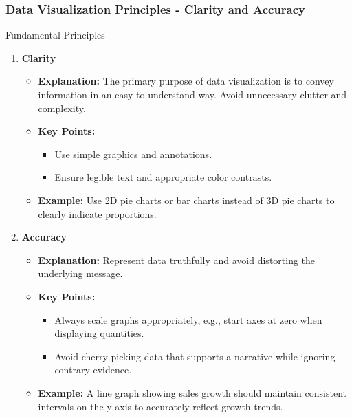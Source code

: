 \documentclass[aspectratio=169]{beamer}
\begin{document}
\begin{frame}[fragile]
    \frametitle{Data Visualization Principles - Clarity and Accuracy}
    \begin{block}{Fundamental Principles}
        \begin{enumerate}
            \item \textbf{Clarity}
                \begin{itemize}
                    \item \textbf{Explanation:} The primary purpose of data visualization is to convey information in an easy-to-understand way. Avoid unnecessary clutter and complexity.
                    \item \textbf{Key Points:}
                        \begin{itemize}
                            \item Use simple graphics and annotations.
                            \item Ensure legible text and appropriate color contrasts.
                        \end{itemize}
                    \item \textbf{Example:} Use 2D pie charts or bar charts instead of 3D pie charts to clearly indicate proportions.
                \end{itemize}
            \item \textbf{Accuracy}
                \begin{itemize}
                    \item \textbf{Explanation:} Represent data truthfully and avoid distorting the underlying message.
                    \item \textbf{Key Points:}
                        \begin{itemize}
                            \item Always scale graphs appropriately, e.g., start axes at zero when displaying quantities.
                            \item Avoid cherry-picking data that supports a narrative while ignoring contrary evidence.
                        \end{itemize}
                    \item \textbf{Example:} A line graph showing sales growth should maintain consistent intervals on the y-axis to accurately reflect growth trends.
                \end{itemize}
        \end{enumerate}
    \end{block}
\end{frame}
\end{document}
